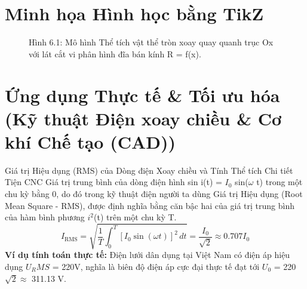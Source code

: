 \documentclass[11pt,a4paper,oneside]{book}
\begin{document}
\section{Minh họa Hình học bằng TikZ}
\begin{figure}[htbp]
\centering
{}
\caption{Hình 6.1: Mô hình Thể tích vật thể tròn xoay quay quanh trục Ox với lát cắt vi phân hình đĩa bán kính R = f(x).}
\label{fig:tikz-ch6-solid}
\end{figure}

\section{Ứng dụng Thực tế \& Tối ưu hóa (Kỹ thuật Điện xoay chiều \& Cơ khí Chế tạo (CAD))}
\begin{ungdung}{Giá trị Hiệu dụng (RMS) của Dòng điện Xoay chiều và Tính Thể tích Chi tiết Tiện CNC}
Giá trị trung bình của dòng điện hình sin i(t) = $I_0$ sin($\omega$ t) trong một chu kỳ bằng 0, do đó trong kỹ thuật điện người ta dùng Giá trị Hiệu dụng (Root Mean Square - RMS), được định nghĩa bằng căn bậc hai của giá trị trung bình của hàm bình phương $i^2$(t) trên một chu kỳ T.
\[ I_{\text{RMS}} = \sqrt{\frac{1}{T} \int_0^T [I_0 \sin(\omega t)]^2\,dt} = \frac{I_0}{\sqrt{2}} \approx 0.707 I_0 \]
\noindent\textbf{Ví dụ tính toán thực tế:} Điện lưới dân dụng tại Việt Nam có điện áp hiệu dụng $U_RMS$ = 220V, nghĩa là biên độ điện áp cực đại thực tế đạt tới $U_0$ = 220$\sqrt{2} \approx$  311.13 V.
\end{ungdung}
\end{document}

